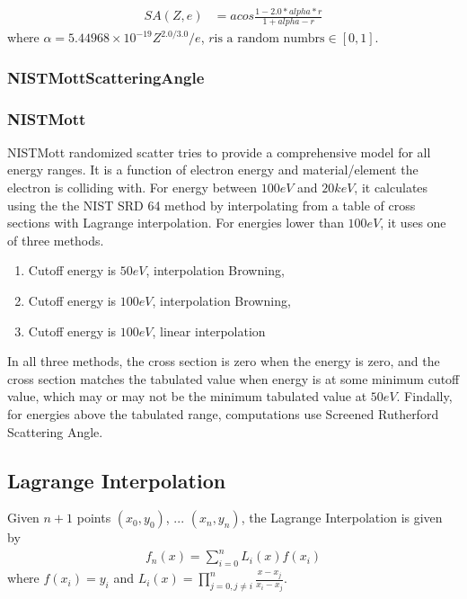 \begin{align*}
    SA(Z, e) &= acos\frac{1 - 2.0 * alpha * r}{1 + alpha - r}
\end{align*}
where $\alpha = 5.44968\times 10^{-19} Z^{2.0 / 3.0} / e$, $r \text{is a random numbrs} \in [0, 1]$.

\subsection{NISTMottScatteringAngle}
\subsection{NISTMott}
NISTMott randomized scatter tries to provide a comprehensive model for all energy ranges. It is a function of electron energy and material/element the electron is colliding with. For energy between $100eV$ and $20keV$, it calculates using the the NIST SRD 64 method by interpolating from a table of cross sections with Lagrange interpolation. For energies lower than $100eV$, it uses one of three methods. 
\begin{enumerate}
\item Cutoff energy is $50 eV$, interpolation Browning,
\item Cutoff energy is $100 eV$, interpolation Browning,
\item Cutoff energy is $100 eV$, linear interpolation
\end{enumerate}
In all three methods, the cross section is zero when the energy is zero, and the cross section matches the tabulated value when energy is at some minimum cutoff value, which may or may not be the minimum tabulated value at $50eV$. Findally, for energies above the tabulated range, computations use Screened Rutherford Scattering Angle.

\begin{appendices}
\chapter{Lagrange Interpolation}
Given $n+1$ points $(x_0, y_0)$, ... $(x_n, y_n)$, the Lagrange Interpolation is given by 
\begin{align*}
    f_n(x) = \sum^{n}_{i=0} L_i(x)f(x_i)
\end{align*}
where $f(x_i) = y_i$ and $L_i(x)=\prod_{j=0,j\ne i}^{n}\frac{x-x_j}{x_i-x_j}$.
\end{appendices}

